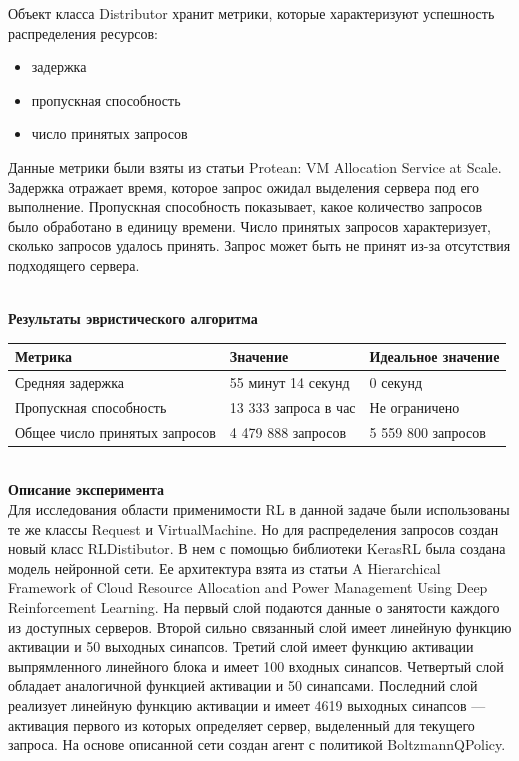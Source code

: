 \documentclass{article}
\begin{document}
Объект класса Distributor хранит метрики, которые характеризуют успешность распределения ресурсов:
\begin{itemize}
\item задержка
\item пропускная способность
\item число принятых запросов 
\end{itemize}
Данные метрики были взяты из статьи Protean: VM Allocation Service at Scale\cite{litlink21}. Задержка отражает время, которое запрос ожидал выделения сервера под его выполнение. Пропускная способность показывает, какое количество запросов было обработано в единицу времени. Число принятых запросов характеризует, сколько запросов удалось принять. Запрос может быть не принят из-за отсутствия подходящего сервера.\\
~\\
\begin{center}
\textbf{Результаты эвристического алгоритма}\\
\begin{tabular}{ | l | l | l | }
\hline
Метрика & Значение & Идеальное значение\\ \hline
Средняя задержка & 55 минут 14 секунд & 0 секунд \\
Пропускная способность & 13 333 запроса в час & Не ограничено \\
Общее число принятых запросов & 4 479 888 запросов & 5 559 800 запросов \\
\hline
\end{tabular}
\end{center}
~\\
\textbf{Описание эксперимента}\\
Для исследования области применимости RL в данной задаче были использованы те же классы Request и VirtualMachine. Но для распределения запросов создан новый класс RLDistibutor. В нем с помощью библиотеки KerasRL была создана модель нейронной сети. Ее архитектура взята из статьи A Hierarchical Framework of Cloud Resource Allocation and Power Management Using Deep Reinforcement Learning\cite{litlink24}. На первый слой подаются данные о занятости каждого из доступных серверов. Второй сильно связанный слой имеет линейную функцию активации и 50 выходных синапсов. Третий слой имеет функцию активации выпрямленного линейного блока и имеет 100 входных синапсов. Четвертый слой обладает аналогичной функцией активации и 50 синапсами. Последний слой реализует линейную функцию активации и имеет 4619 выходных синапсов — активация первого из которых определяет сервер, выделенный для текущего запроса. На основе описанной сети создан агент с политикой BoltzmannQPolicy.\\
\end{document}
